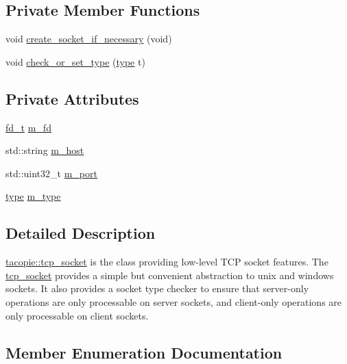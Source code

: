 \subsection*{Private Member Functions}
\begin{DoxyCompactItemize}
\item 
void \hyperlink{classtacopie_1_1tcp__socket_ac2f77e32211a33e0cf4fd8de33946761}{create\+\_\+socket\+\_\+if\+\_\+necessary} (void)
\item 
void \hyperlink{classtacopie_1_1tcp__socket_a53067d6b401c7a7d8c8da3be0713480c}{check\+\_\+or\+\_\+set\+\_\+type} (\hyperlink{classtacopie_1_1tcp__socket_ad8376e85df96ab9523f5d079ed7172ab}{type} t)
\end{DoxyCompactItemize}
\subsection*{Private Attributes}
\begin{DoxyCompactItemize}
\item 
\hyperlink{namespacetacopie_acce7ad26b2d30156b1e6fa353f727026}{fd\+\_\+t} \hyperlink{classtacopie_1_1tcp__socket_a4787aed286af0211f97fd4d1518f7b66}{m\+\_\+fd}
\item 
std\+::string \hyperlink{classtacopie_1_1tcp__socket_a739f43e1f58c67ae7551cfebbcc7394a}{m\+\_\+host}
\item 
std\+::uint32\+\_\+t \hyperlink{classtacopie_1_1tcp__socket_ade0f7688a535423f1057b680bc131d1b}{m\+\_\+port}
\item 
\hyperlink{classtacopie_1_1tcp__socket_ad8376e85df96ab9523f5d079ed7172ab}{type} \hyperlink{classtacopie_1_1tcp__socket_a26ee0857e7e640fa4296af1782bfef7f}{m\+\_\+type}
\end{DoxyCompactItemize}


\subsection{Detailed Description}
\hyperlink{classtacopie_1_1tcp__socket}{tacopie\+::tcp\+\_\+socket} is the class providing low-\/level T\+CP socket features. The \hyperlink{classtacopie_1_1tcp__socket}{tcp\+\_\+socket} provides a simple but convenient abstraction to unix and windows sockets. It also provides a socket type checker to ensure that server-\/only operations are only processable on server sockets, and client-\/only operations are only processable on client sockets. 

\subsection{Member Enumeration Documentation}
\mbox{\label{classtacopie_1_1tcp__socket_ad8376e85df96ab9523f5d079ed7172ab}} 
